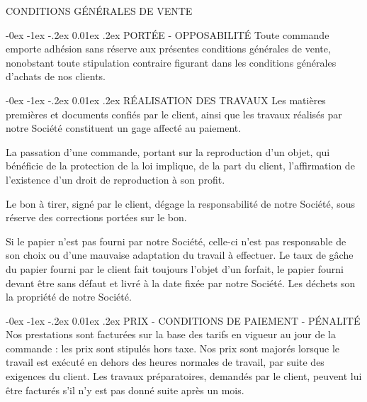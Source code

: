 \documentclass[a4paper, oneside, 10pt, french]{article}
\makeatletter
\renewcommand{\section}{\@startsection {section}{1}{\z@}%
             {-0ex \@plus -1ex \@minus -.2ex}%
             {0.01ex \@plus.2ex}%
             {\normalfont\normalsize\sffamily}}
\makeatother
\begin{document}
\begin{center}
\textcolor{chaumeil-violet}{\textsc{\Large CONDITIONS GÉNÉRALES DE VENTE}}
\end{center}
\begin{multicols}{2}

\begin{small}
\section{PORTÉE - OPPOSABILITÉ}
Toute commande emporte adhésion sans réserve aux présentes conditions générales de vente,
nonobstant toute stipulation contraire figurant dans les conditions générales d'achats de nos
clients.

\section{RÉALISATION DES TRAVAUX}
Les matières premières et documents confiés par le client, ainsi que les
travaux réalisés par notre Société constituent un gage affecté au paiement.

La passation d'une commande, portant sur la reproduction d'un objet, qui bénéficie de la
protection de la loi implique, de la part du client, l'affirmation de l'existence d'un droit de
reproduction à son profit.

Le bon à tirer, signé par le client, dégage la responsabilité de notre Société, sous réserve des
corrections portées sur le bon.

Si le papier n'est pas fourni par notre Société, celle-ci n'est pas responsable de son choix ou
d'une mauvaise adaptation du travail à effectuer. Le taux de gâche du papier fourni par le
client fait toujours l'objet d'un forfait, le papier fourni devant être sans défaut et livré à la date
fixée par notre Société. Les déchets son la propriété de notre Société.

\section{PRIX - CONDITIONS DE PAIEMENT - PÉNALITÉ}
Nos prestations sont facturées sur la base des tarifs en vigueur au jour de la commande : les
prix sont stipulés hors taxe. Nos prix sont majorés lorsque le travail est exécuté en dehors des
heures normales de travail, par suite des exigences du client. Les travaux préparatoires,
demandés par le client, peuvent lui être facturés s'il n'y est pas donné suite après un mois.


\end{small}
\end{multicols}
\end{document}
